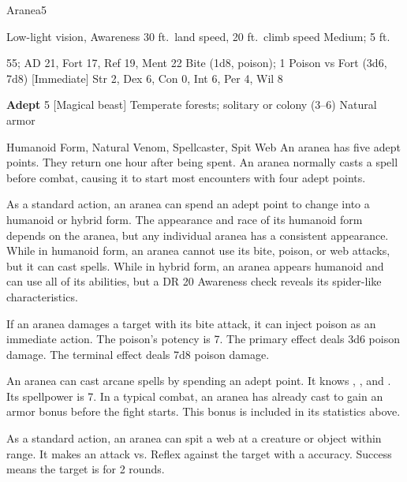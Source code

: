     \begin{monsection}{Aranea}{5}
        \begin{spellcontent}
            \begin{spelltargetinginfo}
                \pari {} Low-light vision, Awareness 
                \pari {} 30 ft.\ land speed, 20 ft.\ climb speed
                \pari {} Medium;  5 ft.
            \end{spelltargetinginfo}
            \begin{spelleffects}
                \pari {} 55;  AD 21, Fort 17, Ref 19, Ment 22
                \pari {} Bite  (1d8, poison);  1
                \pari {} Poison  vs Fort (3d6, 7d8) [Immediate]
                \pari {} Str 2, Dex 6, Con 0, Int 6, Per 4, Wil 8
            \end{spelleffects}
        \end{spellcontent}
        \begin{spellfooter}
            \pari {} \textbf{Adept} 5 [Magical beast]
            \pari {} Temperate forests; solitary or colony (3--6)
            \pari {} Natural armor 
        \end{spellfooter}
    \end{monsection}
     Humanoid Form, Natural Venom, Spellcaster, Spit Web
     An aranea has five adept points. They return one hour after being spent.
    An aranea normally casts a spell before combat, causing it to start most encounters with four adept points.

     As a standard action, an aranea can spend an adept point to change into a humanoid or hybrid form.
    The appearance and race of its humanoid form depends on the aranea, but any individual aranea has a consistent appearance.
    While in humanoid form, an aranea cannot use its bite, poison, or web attacks, but it can cast spells.
    While in hybrid form, an aranea appears humanoid and can use all of its abilities, but a DR 20 Awareness check reveals its spider-like characteristics.

     If an aranea damages a target with its bite attack, it can inject poison as an immediate action.
    The poison's potency is 7.
    The primary effect deals 3d6 poison damage.
    The terminal effect deals 7d8 poison damage.

     An aranea can cast arcane spells by spending an adept point.
    It knows , , and .
    Its spellpower is 7.
    In a typical combat, an aranea has already cast  to gain an armor bonus before the fight starts.
    This bonus is included in its statistics above.

     As a standard action, an aranea can spit a web at a creature or object within \rngmed range.
    It makes an attack vs. Reflex against the target with a  accuracy.
    Success means the target is \immobilized for 2 rounds.
